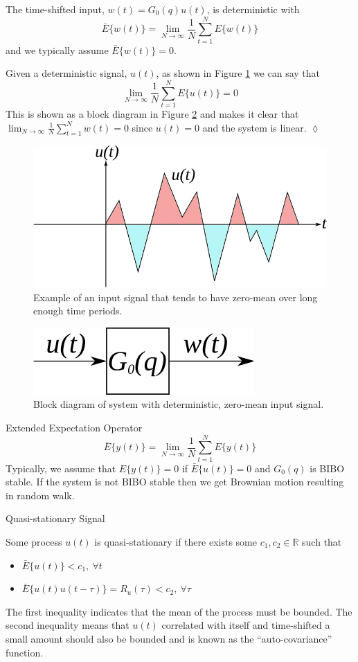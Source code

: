The time-shifted input, $w(t)=G_0(q)u(t)$, is deterministic with
$$\bar{E}\{w(t)\} = \lim_{N\to\infty}\frac{1}{N}\sum_{t=1}^NE\{w(t)\}$$
and we typically assume $\bar{E}\{w(t)\}=0$.

\begin{example}
Given a deterministic signal, $u(t)$, as shown in Figure \ref{fig:04inputSignal} we can say that
$$\lim_{N\to\infty}\frac{1}{N}\sum_{t=1}^NE\{u(t)\} = 0$$
This is shown as a block diagram in Figure \ref{fig:04detSignal} and makes it clear that $\lim_{N\to\infty}\frac{1}{N}\sum_{t=1}^Nw(t)=0$ since $u(t)=0$ and the system is linear.
$\lozenge$
\end{example}
\begin{figure}[ht!]
	\centering
	\includegraphics[width=.5\textwidth]{images/04inputSignal}
	\caption{Example of an input signal that tends to have zero-mean over long enough time periods.}
	\label{fig:04inputSignal}
\end{figure}

\begin{figure}[ht!]
	\centering
	\includegraphics[width=.3\textwidth]{images/04detSignal}
	\caption{Block diagram of system with deterministic, zero-mean input signal.}
	\label{fig:04detSignal}
\end{figure}

\begin{definition}{Extended Expectation Operator}
$$\bar{E}\{y(t)\}=\lim_{N\to\infty}\frac{1}{N}\sum_{t=1}^NE\{y(t)\}$$
Typically, we assume that $E\{y(t)\}=0$ if $\bar{E}\{u(t)\}=0$ and $G_0(q)$ is BIBO stable. If the system is not BIBO stable then we get Brownian motion resulting in random walk.
\end{definition}

\begin{definition}{Quasi-stationary Signal}

Some process $u(t)$ is quasi-stationary if there exists some $c_1, c_2 \in\mathbb{R}$ such that
\begin{itemize}
\item $\bar{E}\{u(t)\} < c_1, ~\forall t$
\item $\bar{E}\{u(t)u(t-\tau)\} = R_u(\tau) < c_2, ~\forall \tau$
\end{itemize}
The first inequality indicates that the mean of the process must be bounded. The second inequality means that $u(t)$ correlated with itself and time-shifted a small amount should also be bounded and is known as the ``auto-covariance'' function.
\end{definition}

